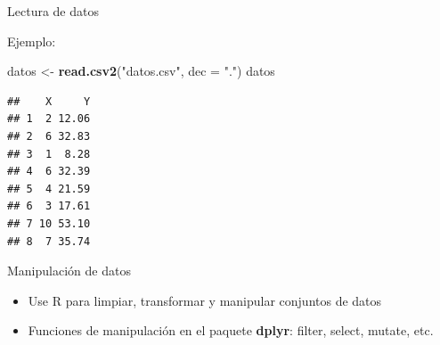 \documentclass[
  ignorenonframetext,
  aspectratio=169]{beamer}
\newenvironment{Shaded}{\begin{snugshade}}{\end{snugshade}}
\newcommand{\DataTypeTok}[1]{\textcolor[rgb]{0.13,0.29,0.53}{#1}}
\newcommand{\KeywordTok}[1]{\textcolor[rgb]{0.13,0.29,0.53}{\textbf{#1}}}
\newcommand{\NormalTok}[1]{#1}
\newcommand{\OperatorTok}[1]{\textcolor[rgb]{0.81,0.36,0.00}{\textbf{#1}}}
\newcommand{\StringTok}[1]{\textcolor[rgb]{0.31,0.60,0.02}{#1}}
\begin{document}
\begin{frame}[fragile]

\begin{block}{Lectura de datos}

Ejemplo:

\begin{Shaded}
\begin{Highlighting}[]
\NormalTok{datos <-}\StringTok{ }\KeywordTok{read.csv2}\NormalTok{(}\StringTok{"datos.csv"}\NormalTok{, }\DataTypeTok{dec =} \StringTok{"."}\NormalTok{)}
\NormalTok{datos}
\end{Highlighting}
\end{Shaded}

\begin{verbatim}
##    X     Y
## 1  2 12.06
## 2  6 32.83
## 3  1  8.28
## 4  6 32.39
## 5  4 21.59
## 6  3 17.61
## 7 10 53.10
## 8  7 35.74
\end{verbatim}

\end{block}

\end{frame}

\begin{frame}[fragile]

\begin{block}{Manipulación de datos}

\begin{itemize}
\item
  Use R para limpiar, transformar y manipular conjuntos de datos
\item
  Funciones de manipulación en el paquete \textbf{dplyr}: filter,
  select, mutate, etc.
\end{itemize}

\begin{Shaded}
\end{Shaded}

\end{block}

\end{frame}
\end{document}
